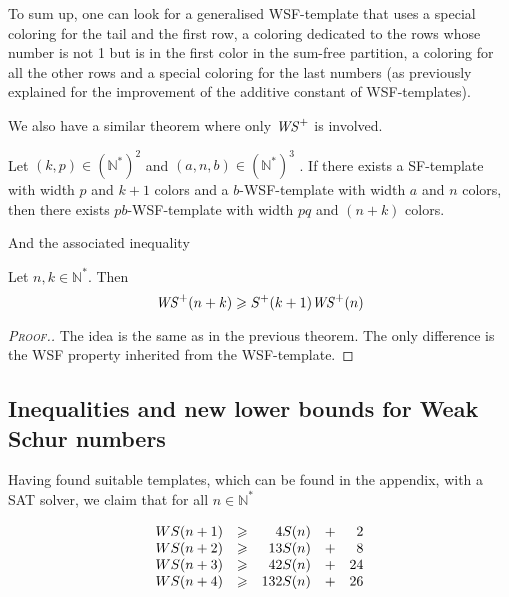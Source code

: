 \par
To sum up, one can look for a generalised WSF-template that uses a special coloring for the tail and the first row, a
coloring dedicated to the rows whose number is not 1 but is in the first color in the sum-free partition, a coloring for all
the other rows and a special coloring for the last numbers (as previously explained for the improvement of the additive
constant of WSF-templates).

We also have a similar theorem where only \(\mathit{WS}^+\) is involved.

\begin{theorem}
Let \((k,p) \in (\mathbb{N}^*)^2\) and \((a, n, b) \in (\mathbb{N}^*)^3\) . If there exists a SF-template with width 
\(p\) and \(k+1\) colors and a \(b\)-WSF-template with width \(a\) and \(n\) colors, then there exists \(pb\)-WSF-template 
with width \(pq\) and \((n+k)\) colors.
\end{theorem}

And the associated inequality

\begin{corollary}
Let \(n, k \in \mathbb{N}^*\). Then
\[
\mathit{WS}^+(n+k) \geqslant S^+(k+1) \mathit{WS}^+(n)
\]
\end{corollary}

\begin{proof}[\textsc{Proof.}]
The idea is the same as in the previous theorem. The only difference is the WSF property inherited
from the WSF-template.
\end{proof}



\subsection{Inequalities and new lower bounds for Weak Schur numbers}

\qquad Having found suitable templates, which can be found in the appendix, with a SAT solver, we claim that for all \(n \in
\mathbb{N}^*\)

\[
\begin{array}{r r r r r}
	WS(n + 1) & \geqslant & 4 S(n) & + & 2 \\
	WS(n + 2) & \geqslant & 13 S(n) & + & 8 \\
	WS(n + 3) & \geqslant & 42 S(n) & + & 24 \\
	WS(n + 4) & \geqslant & 132 S(n) & + & 26 \\
\end{array}
\]

